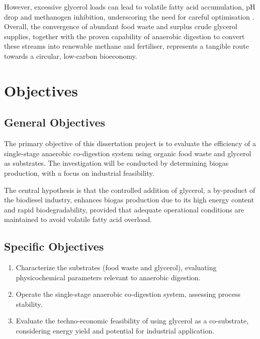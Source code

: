 However, excessive glycerol loads can lead to volatile fatty acid accumulation, pH drop and methanogen inhibition, underscoring the need for careful optimisation \parencite{gebreegziabher2025, tomczak2025}. Overall, the convergence of abundant food waste and surplus crude glycerol supplies, together with the proven capability of anaerobic digestion to convert these streams into renewable methane and fertiliser, represents a tangible route towards a circular, low-carbon bioeconomy.

\chapter{Objectives}
\label{ch:objectives}

\section{General Objectives}
\label{sec:general_objectives}

The primary objective of this dissertation project is to evaluate the efficiency of a single-stage anaerobic co-digestion system using organic food waste and glycerol as substrates. The investigation will be conducted by determining biogas production, with a focus on industrial feasibility.


The central hypothesis is that the controlled addition of glycerol, a by-product of the biodiesel industry, enhances biogas production due to its high energy content and rapid biodegradability, provided that adequate operational conditions are maintained to avoid volatile fatty acid overload.

\section{Specific Objectives}
\label{sec:specific_objectives}

\begin{enumerate}
    \item Characterize the substrates (food waste and glycerol), evaluating physicochemical parameters relevant to anaerobic digestion.
    \item Operate the single-stage anaerobic co-digestion system, assessing process stability.
    \item Evaluate the techno-economic feasibility of using glycerol as a co-substrate, considering energy yield and potential for industrial application.
\end{enumerate}

